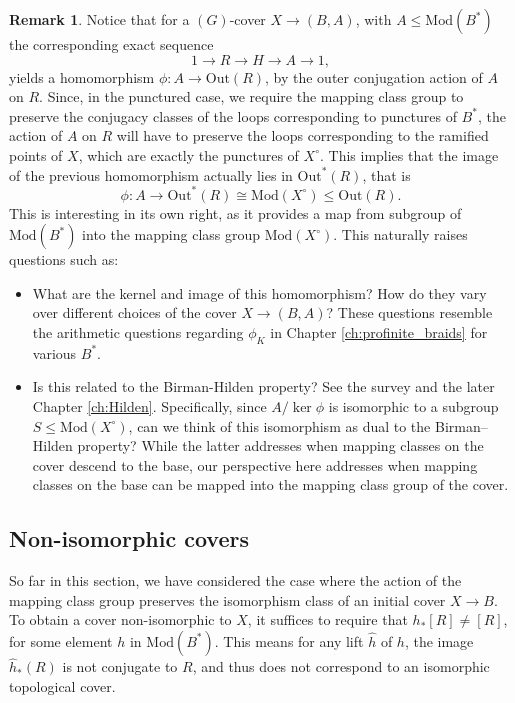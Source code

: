 \documentclass[10pt]{amsart}
\theoremstyle{definition}
\newtheorem{remark}[theorem]{Remark}
\begin{document}
\begin{remark} Notice that for a $(G)$-cover $X\rightarrow (B,A)$, with $A\leq \mathrm{Mod}(B^*)$ the corresponding exact sequence
\[1 \rightarrow R \rightarrow H \rightarrow A \rightarrow 1,\] yields a homomorphism $ \phi: A\rightarrow \mathrm{Out}(R)$, by the outer conjugation action of $A$ on $R$. Since, in the punctured case, we require the mapping class group to preserve the conjugacy classes of the loops corresponding to punctures of $B^*$, the action of $A$ on $R$ will have to preserve the loops corresponding to the ramified points of $X$, which are exactly the punctures of $X^\circ$. This implies that the image of the previous homomorphism actually lies in $\mathrm{Out}^*(R)$, that is
\[ \phi: A \rightarrow \mathrm{Out}^*(R) \cong \mathrm{Mod}(X^\circ) \leq \mathrm{Out}(R).\] 
This is interesting in its own right, as it provides a map from subgroup of $\mathrm{Mod}(B^*)$ into the mapping class group $\mathrm{Mod}(X^\circ)$. This naturally raises questions such as: 
\begin{itemize}
\item What are the kernel and image of this homomorphism? How do they vary over different choices of the cover $X\rightarrow (B,A)$?  These questions resemble the arithmetic questions regarding $\phi_K$ in Chapter \ref{ch:profinite_braids} for various $B^*$. 
\item Is this related to the Birman-Hilden property? See the survey \cite{MR4275077} and the later Chapter \ref{ch:Hilden}.  Specifically, since $A/\ker\phi$ is isomorphic to a subgroup $S \leq \mathrm{Mod}(X^\circ)$, can we think of this isomorphism as dual to the Birman–Hilden property? While the latter addresses when mapping classes on the cover descend to the base, our perspective here addresses when mapping classes on the base can be mapped into the mapping class group of the cover.
\end{itemize}
\end{remark}

\subsection{Non-isomorphic covers}
So far in this section, we have considered the case where the action of the mapping class group preserves the isomorphism class of an initial cover $X\rightarrow B$. To obtain a cover non-isomorphic to $X$, it suffices to require that $h_* [R] \neq [R]$, for some element $h$ in $\mathrm{Mod}(B^*)$. This means for any lift $\hat{h}$ of $h$, the image $\hat{h}_*(R)$ is not conjugate to $R$, and thus does not correspond to an isomorphic topological cover.
\end{document}
